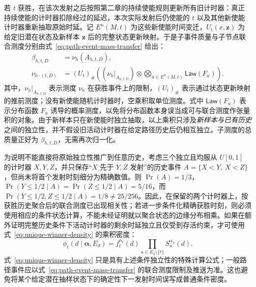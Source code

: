 \documentclass[master,fontset=ubuntu]{shnuthesis}
\theoremstyle{definition}
\begin{document}
若 \(t\) 获胜，在该次发射之后按照第二章的持续使能规则更新所有旧计时器：真正持续使能的计时器扣除经过的延迟，本次实际发射后仍使能的 \(t\) 以及其他新使能计时器重新抽取原始时延。记 \(E^n(M,t)\) 为这些新使能时间变迁，\(U_t(x,\mathbf z)\) 为给定旧潜在状态及新样本 \(\mathbf z\) 后的完整状态更新映射。于是子事件质量与子节点联合测度分别由式~\eqref{eq:path-event-mass-transfer} 给出：
\begin{equation}
\begin{aligned}
\beta_{h,t,D}
&=\nu_h(A_{h,t,D}),\\
\nu_{h\cdot(t,D)}
&=(U_t)_\#\!\left(
(\left.\nu_h\right|_{A_{h,t,D}})
\otimes
\bigotimes_{u\in E^n(M,t)}\mathsf{Law}(F_u)
\right).
\end{aligned}
\label{eq:path-event-mass-transfer}
\end{equation}
其中，\(\left.\nu_h\right|_{A_{h,t,D}}\) 表示测度 \(\nu_h\) 在获胜事件上的限制，\((U_t)_\#\) 表示通过状态更新映射的推前测度；没有新使能随机计时器时，空乘积取单位测度。式中 \(\mathsf{Law}(F_u)\) 表示分布函数 \(F_u\) 诱导的概率测度，以免将分布函数本身误当成可与联合测度作张量积的对象。由于新样本只在新使能时独立抽取，以上乘积只涉及\emph{新样本与已有历史}之间的独立性，并不假设旧活动计时器在给定路径历史后仍相互独立。子测度的总质量正好为 \(\beta_{h,t,D}\)，无需再次归一化。

为说明不能直接将原始独立性推广到任意历史，考虑三个独立且均服从 \(U[0,1]\) 的计时器 \(X,Y,Z\)，并只保存“\(X\) 先于 \(Y,Z\) 发射”的历史事件 \(A=\{X<Y,\ X<Z\}\)，但尚未将首个发射时刻细分为精确数值。则 \(\Pr(A)=1/3\)，\(\Pr(Y\leq1/2\mid A)=\Pr(Z\leq1/2\mid A)=5/16\)，而 \(\Pr(Y\leq1/2,Z\leq1/2\mid A)=1/8\neq25/256\)。因此，在保留的两个计时器上，按获胜历史聚合后的联合测度已出现相关性；若进一步条件化精确获胜时刻，则必须使用相应的条件状态计算，不能未经证明就以聚合状态的边缘分布相乘。如果在额外证明完整历史条件下活动计时器的剩余时延独立且仅受到存活约束，才可使用式~\eqref{eq:unique-winner-density} 的乘积密度：
\begin{equation}
\phi_t(d\mid\boldsymbol\alpha,E_d)
=
 f_t^{\alpha_t}(d)
 \prod_{u\in E_d\setminus\{t\}}
 S_u^{\alpha_u}(d).
\label{eq:unique-winner-density}
\end{equation}
式~\eqref{eq:unique-winner-density} 只是具有上述条件独立性的特殊计算公式；一般路径事件应以式~\eqref{eq:path-event-mass-transfer} 的联合测度限制及推送为准。这也避免将某个给定潜在抽样状态下的确定性下一发射时间误写成普通条件密度。
\end{document}
